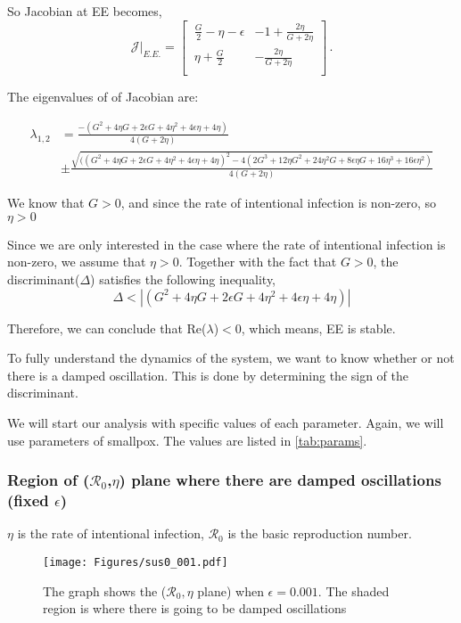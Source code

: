 \documentclass[12pt]{article}
\newcommand{\R}{\mathcal{R}}
\begin{document}
So Jacobian at EE becomes,
\begin{equation}
\mathcal{J}|_{E.E.}=
\begin{bmatrix}
    \ \frac{G}{2}-\eta-\epsilon       & -1+\frac{2\eta}{G+2\eta} \\
    \ \eta+\frac{G}{2}       & -\frac{2\eta}{G+2\eta} \\
\end{bmatrix}\,.
\end{equation}

The eigenvalues of of Jacobian are:

\begin{align}
\lambda_{1,2} &= \frac{-(G^2+4\eta G+2\epsilon G+4\eta^2+4\epsilon\eta+4\eta) }{4(G+2\eta)}\\
& \pm \frac{\sqrt{((G^2+4\eta G+2\epsilon G+4\eta^2+4\epsilon\eta+4\eta)^2-4(2G^3+12\eta G^2+24\eta^2 G+8\epsilon\eta G+16\eta^3+16\epsilon\eta^2)}}{4(G+2\eta)}
\end{align}

We know that $G>0$, and since the rate of intentional infection is non-zero, so $\eta >0$

Since we are only interested in the case where the rate of intentional infection is non-zero, we assume that $\eta>0$. Together with the fact that $G>0$, the discriminant($\Delta$) satisfies the following inequality,
\begin{equation}
\Delta<|(G^2+4\eta G+2\epsilon G+4\eta^2+4\epsilon\eta+4\eta)|
\end{equation}

Therefore, we can conclude that Re($\lambda$)$<0$, which means, EE is stable.

To fully understand the dynamics of the system, we want to know whether or not there is a damped oscillation. This is done by determining the sign of the discriminant.

We will start our analysis with specific values of each parameter. Again, we will use parameters of smallpox. The values are listed in \autoref{tab:params}.
\subsubsection{Region of ($\R_0$,$\eta$) plane where there are damped oscillations (fixed $\epsilon$)}

$\eta$ is the rate of intentional infection, $\R_0$ is the basic reproduction number.
\begin{figure}[H]
  \centering
  \texttt{[image: Figures/sus0\_001.pdf]}
  \caption{The graph shows the ($\R_0,\eta$ plane) when $\epsilon=0.001$. The shaded region is where there is going to be damped oscillations}
\end{figure}
\end{document}
